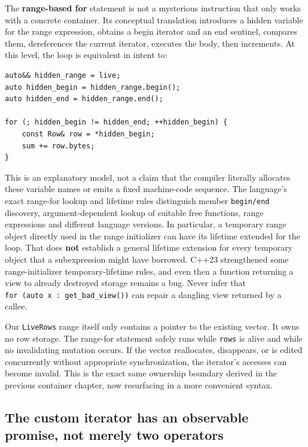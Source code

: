The \textbf{range-based for} statement is not a mysterious instruction that only works with a concrete container. Its conceptual translation introduces a hidden variable for the range expression, obtains a begin iterator and an end sentinel, compares them, dereferences the current iterator, executes the body, then increments. At this level, the loop is equivalent in intent to:

\begin{verbatim}
auto&& hidden_range = live;
auto hidden_begin = hidden_range.begin();
auto hidden_end = hidden_range.end();

for (; hidden_begin != hidden_end; ++hidden_begin) {
    const Row& row = *hidden_begin;
    sum += row.bytes;
}
\end{verbatim}

This is an explanatory model, not a claim that the compiler literally allocates these variable names or emits a fixed machine-code sequence. The language's exact range-for lookup and lifetime rules distinguish member \texttt{begin/end} discovery, argument-dependent lookup of suitable free functions, range expressions and different language versions. In particular, a temporary range object directly used in the range initializer can have its lifetime extended for the loop. That does \textbf{not} establish a general lifetime extension for every temporary object that a subexpression might have borrowed. C++23 strengthened some range-initializer temporary-lifetime rules, and even then a function returning a view to already destroyed storage remains a bug. Never infer that \texttt{for\ (auto\ x\ :\ get\_bad\_view())} can repair a dangling view returned by a callee.

Our \texttt{LiveRows} range itself only contains a pointer to the existing vector. It owns no row storage. The range-for statement safely runs while \texttt{rows} is alive and while no invalidating mutation occurs. If the vector reallocates, disappears, or is edited concurrently without appropriate synchronization, the iterator's accesses can become invalid. This is the exact same ownership boundary derived in the previous container chapter, now resurfacing in a more convenient syntax.

\subsection{The custom iterator has an observable promise, not merely two operators}\label{05-engine-i-ch006-the-custom-iterator-has-an-observable-promise-not-merely-two-operators}

